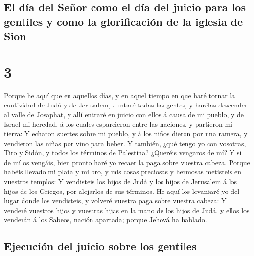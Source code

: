 \hypertarget{el-duxeda-del-seuxf1or-como-el-duxeda-del-juicio-para-los-gentiles-y-como-la-glorificaciuxf3n-de-la-iglesia-de-sion}{%
\subsection{El día del Señor como el día del juicio para los gentiles y
como la glorificación de la iglesia de
Sion}\label{el-duxeda-del-seuxf1or-como-el-duxeda-del-juicio-para-los-gentiles-y-como-la-glorificaciuxf3n-de-la-iglesia-de-sion}}

\hypertarget{section-2}{%
\section{3}\label{section-2}}

 Porque he aquí que en aquellos días, y en aquel tiempo en
que haré tornar la cautividad de Judá y de Jerusalem, 
Juntaré todas las gentes, y harélas descender al valle de Josaphat, y
allí entraré en juicio con ellos á causa de mi pueblo, y de Israel mi
heredad, á los cuales esparcieron entre las naciones, y partieron mi
tierra:  Y echaron suertes sobre mi pueblo, y á los niños
dieron por una ramera, y vendieron las niñas por vino para beber.
 Y también, ¿qué tengo yo con vosotras, Tiro y Sidón, y
todos los términos de Palestina? ¿Queréis vengaros de mí? Y si de mí os
vengáis, bien pronto haré yo recaer la paga sobre vuestra cabeza.
 Porque habéis llevado mi plata y mi oro, y mis cosas
preciosas y hermosas metisteis en vuestros templos:  Y
vendisteis los hijos de Judá y los hijos de Jerusalem á los hijos de los
Griegos, por alejarlos de sus términos.  He aquí los
levantaré yo del lugar donde los vendisteis, y volveré vuestra paga
sobre vuestra cabeza:  Y venderé vuestros hijos y vuestras
hijas en la mano de los hijos de Judá, y ellos los venderán á los
Sabeos, nación apartada; porque Jehová ha hablado.

\hypertarget{ejecuciuxf3n-del-juicio-sobre-los-gentiles}{%
\subsection{Ejecución del juicio sobre los
gentiles}\label{ejecuciuxf3n-del-juicio-sobre-los-gentiles}}

